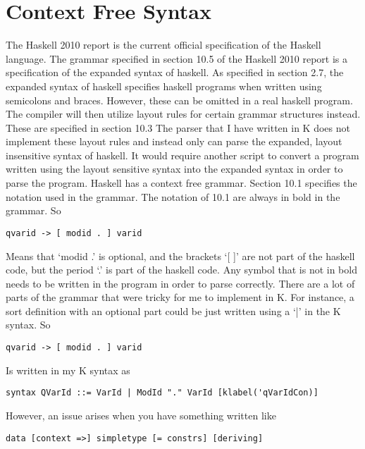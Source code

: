 \chapter{Context Free Syntax}
The Haskell 2010 report is the current official specification of the Haskell language. %
The grammar specified in section 10.5 of the Haskell 2010 report is a specification of the expanded syntax of haskell.
As specified in section 2.7, the expanded syntax of haskell specifies haskell programs when written using semicolons and braces. However, these can be omitted in a real haskell program. The compiler will then utilize layout rules for certain grammar structures instead. These are specified in section 10.3
The parser that I have written in K does not implement these layout rules and instead only can parse the expanded, layout insensitive syntax of haskell. It would require another script to convert a program written using the layout sensitive syntax into the expanded syntax in order to parse the program.
Haskell has a context free grammar.
	Section 10.1 specifies the notation used in the grammar.
The notation of 10.1 are always in bold in the grammar. So
\begin{lstlisting}
qvarid -> [ modid . ] varid
\end{lstlisting}
Means that ‘modid .’ is optional, and the brackets ‘[ ]’ are not part of the haskell code, but the period ‘.’ is part of the haskell code. Any symbol that is not in bold needs to be written in the program in order to parse correctly.
There are a lot of parts of the grammar that were tricky for me to implement in K. For instance, a sort definition with an optional part could be just written using a ‘|’ in the K syntax. So 
\begin{lstlisting}
qvarid -> [ modid . ] varid
\end{lstlisting}
Is written in my K syntax as
\begin{lstlisting}
syntax QVarId ::= VarId | ModId "." VarId [klabel('qVarIdCon)]
\end{lstlisting}
However, an issue arises when you have something written like
\begin{lstlisting}
data [context =>] simpletype [= constrs] [deriving]
\end{lstlisting}
